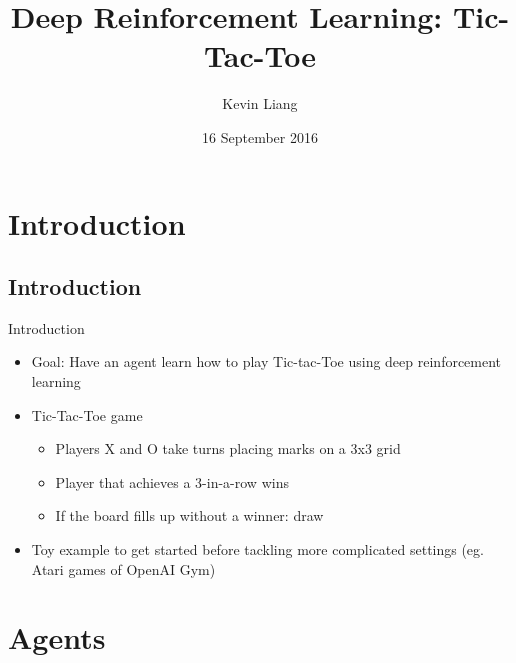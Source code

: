 \documentclass[11pt]{beamer}
\title[CLGP]{Deep Reinforcement Learning: Tic-Tac-Toe }
\author[Liang]{Kevin Liang}
\institute[Duke University]{Duke University}
\date{16 September 2016}
\begin{document}
\begin{frame}
\maketitle
\end{frame}



\section{Introduction}

\subsection{Introduction}
\begin{frame}{Introduction}
	\begin{itemize}
	
		\item Goal: Have an agent learn how to play Tic-tac-Toe using deep reinforcement learning 
		\item Tic-Tac-Toe game
		\begin{itemize}
			\item Players X and O take turns placing marks on a 3x3 grid
			\item Player that achieves a 3-in-a-row wins
			\item If the board fills up without a winner: draw
		\end{itemize}
		\item Toy example to get started before tackling more complicated settings (eg. Atari games of OpenAI Gym)
		
	\end{itemize}
\end{frame}

\section{Agents}
\end{document}
